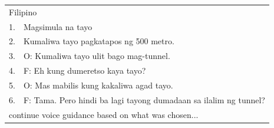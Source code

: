 \begin{table}[h]
\begin{tabular}{ll}
                        &                                                              \\ \hline
\multicolumn{2}{l}{Filipino}                                                           \\ \hline
1.                      & Magsimula na tayo                                            \\
2.                      & Kumaliwa tayo pagkatapos ng 500 metro.                       \\ \hline
\multicolumn{1}{|l}{3.} & \multicolumn{1}{l|}{O: Kumaliwa tayo ulit bago mag-tunnel.}  \\
\multicolumn{1}{|l}{4.} & \multicolumn{1}{l|}{F: Eh kung dumeretso kaya tayo?}         \\
\multicolumn{1}{|l}{5.} & \multicolumn{1}{l|}{O: Mas mabilis kung kakaliwa agad tayo.} \\
\multicolumn{1}{|l}{6.} & \multicolumn{1}{l|}{F: Tama. Pero hindi ba lagi tayong dumadaan sa ilalim ng tunnel?} \\ \hline
\multicolumn{2}{l}{continue voice guidance based on what was chosen...}                \\ \hline
\end{tabular}
\end{table}

